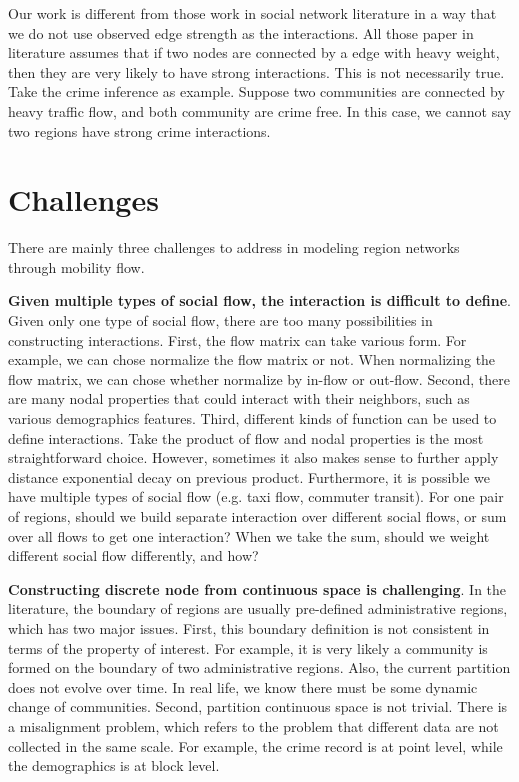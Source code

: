 Our work is different from those work in social network literature in a way that we do not use observed edge strength as the interactions. All those paper in literature assumes that if two nodes are connected by a edge with heavy weight, then they are very likely to have strong interactions. This is not necessarily true. Take the crime inference as example. Suppose two communities are connected by heavy traffic flow, and both community are crime free. In this case, we cannot say two regions have strong crime interactions.







\section{Challenges}

There are mainly three challenges to address in modeling region networks through mobility flow.

\textbf{Given multiple types of social flow, the interaction is difficult to define}. Given only one type of social flow, there are too many possibilities in constructing interactions.  First, the flow matrix can take various form. For example, we can chose normalize the flow matrix or not. When normalizing the flow matrix, we can chose whether normalize by in-flow or out-flow. Second, there are many nodal properties that could interact with their neighbors, such as various demographics features. Third, different kinds of function can be used to define interactions. Take the product of flow and nodal properties is the most straightforward choice. However, sometimes it also makes sense to further apply distance exponential decay on previous product.  Furthermore, it is possible we have multiple types of social flow (e.g. taxi flow, commuter transit). For one pair of regions, should we build separate interaction over different social flows, or sum over all flows to get one interaction? When we take the sum, should we weight different social flow differently, and how?



\textbf{Constructing discrete node from continuous space is challenging}. In the literature, the boundary of regions are usually pre-defined administrative regions, which has two major issues. First, this boundary definition is not consistent in terms of the property of interest. For example, it is very likely a community is formed on the boundary of two administrative regions. Also, the current partition does not evolve over time. In real life, we know there must be some dynamic change of communities. Second, partition continuous space is not trivial. There is a misalignment problem, which refers to the problem that different data are not collected in the same scale. For example, the crime record is at point level, while the demographics is at block level.



